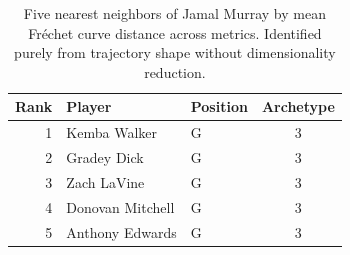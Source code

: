 \begin{table}[htbp]
  \centering\small
  \begin{tabular}{rllc}
    \toprule
    Rank & Player & Position & Archetype \\
    \midrule
    1 & Kemba Walker & G & 3 \\
    2 & Gradey Dick & G & 3 \\
    3 & Zach LaVine & G & 3 \\
    4 & Donovan Mitchell & G & 3 \\
    5 & Anthony Edwards & G & 3 \\
    \bottomrule
  \end{tabular}
  \caption{Five nearest neighbors of Jamal Murray by mean Fr\'{e}chet curve distance across metrics. Identified purely from trajectory shape without dimensionality reduction.}
  \label{tab:Jamal_Murray_frechet_curve_neighbors}
\end{table}

